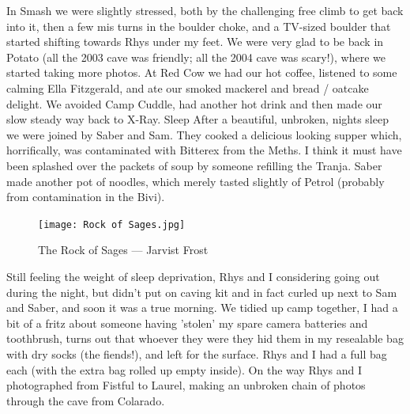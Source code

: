 \documentclass[onecolumn]{book}
\begin{document}
In Smash we were slightly stressed, both by the challenging free climb to get back into it, then a few mis turns in the boulder choke, and a TV-sized boulder that started shifting towards Rhys under my feet. We were very glad to be back in Potato (all the 2003 cave was friendly; all the 2004 cave was scary!), where we started taking more photos.
At Red Cow we had our hot coffee, listened to some calming Ella Fitzgerald, and ate our smoked mackerel and bread / oatcake delight. We avoided Camp Cuddle, had another hot drink and then made our slow steady way back to X-Ray.
Sleep
After a beautiful, unbroken, nights sleep we were joined by Saber and Sam. They cooked a delicious looking supper which, horrifically, was contaminated with Bitterex from the Meths. I think it must have been splashed over the packets of soup by someone refilling the Tranja. Saber made another pot of noodles, which merely tasted slightly of Petrol (probably from contamination in the Bivi).

\begin{figure}[h]
\centering
\texttt{[image: Rock of Sages.jpg]}
\caption{The Rock of Sages --- Jarvist Frost}
\label{Rock of Sages}
\end{figure}

Still feeling the weight of sleep deprivation, Rhys and I considering going out during the night, but didn't put on caving kit and in fact curled up next to Sam and Saber, and soon it was a true morning. We tidied up camp together, I had a bit of a fritz about someone having 'stolen' my spare camera batteries and toothbrush, turns out that whoever they were they hid them in my resealable bag with dry socks (the fiends!), and left for the surface. Rhys and I had a full bag each (with the extra bag rolled up empty inside). On the way Rhys and I photographed from Fistful to Laurel, making an unbroken chain of photos through the cave from Colarado.
\end{document}
